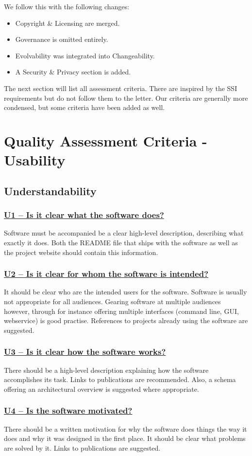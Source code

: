 \documentclass[a4paper,11pt]{article}
\newcommand{\criterion}[1]{\subsubsection*{\underline{#1}}}
\begin{document}
We follow this with the following changes:

\begin{itemize}
\item Copyright \& Licensing are merged.
\item Governance is omitted entirely.
\item Evolvability was integrated into Changeability.
\item A Security \& Privacy section is added.
\end{itemize}

The next section will list all assessment criteria. There are inspired by the
SSI requirements but do not follow them to the letter. Our criteria are
generally more condensed, but some criteria have been added as well.

\section{Quality Assessment Criteria - Usability}

\subsection{Understandability}

\criterion{U1 -- Is it clear what the software does?}

Software must be accompanied be a clear high-level description, describing what
exactly it does. Both the README file that ships with the software as well as
the project website should contain this information. 

\criterion{U2 -- Is it clear for whom the software is intended?}

It should be clear who are the intended users for the software. Software is
usually not appropriate for all audiences. Gearing software at multiple
audiences however, through for instance offering multiple interfaces (command
line, GUI, webservice) is good practise. References to projects already using the
software are suggested.

\criterion{U3 -- Is it clear how the software works?}

There should be a high-level description explaining how the software
accomplishes its task. Links to publications are recommended. Also, a schema
offering an architectural overview is suggested where appropriate. 

\criterion{U4 -- Is the software motivated?}

There should be a written motivation for why the software does things the way
it does and why it was designed in the first place. It should be clear what
problems are solved by it. Links to publications are suggested.
\end{document}
